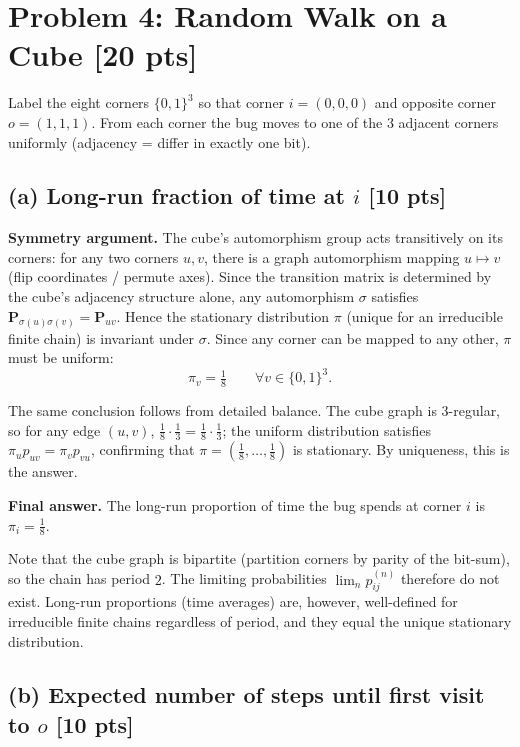 \documentclass[12pt]{article}
\newcommand{\mat}[1]{\bm{#1}}
\begin{document}
\section*{Problem 4: Random Walk on a Cube \hfill [20 pts]}

Label the eight corners $\{0,1\}^3$ so that corner $i=(0,0,0)$ and opposite corner $o=(1,1,1)$. From each corner the bug moves to one of the $3$ adjacent corners uniformly (adjacency = differ in exactly one bit).

\subsection*{(a) Long-run fraction of time at $i$ [10 pts]}

\textbf{Symmetry argument.} The cube's automorphism group acts transitively on its corners: for any two corners $u,v$, there is a graph automorphism mapping $u\mapsto v$ (flip coordinates / permute axes). Since the transition matrix is determined by the cube's adjacency structure alone, any automorphism $\sigma$ satisfies $\mat P_{\sigma(u)\sigma(v)}=\mat P_{uv}$. Hence the stationary distribution $\pi$ (unique for an irreducible finite chain) is invariant under $\sigma$. Since any corner can be mapped to any other, $\pi$ must be uniform:
\[
  \pi_v = \tfrac{1}{8}\qquad\forall v\in\{0,1\}^3.
\]

The same conclusion follows from detailed balance. The cube graph is $3$-regular, so for any edge $(u,v)$, $\tfrac{1}{8}\cdot\tfrac{1}{3}=\tfrac{1}{8}\cdot\tfrac{1}{3}$; the uniform distribution satisfies $\pi_u p_{uv}=\pi_v p_{vu}$, confirming that $\pi=(\tfrac18,\dots,\tfrac18)$ is stationary. By uniqueness, this is the answer.

\textbf{Final answer.} The long-run proportion of time the bug spends at corner $i$ is $\pi_i=\tfrac{1}{8}$.

Note that the cube graph is bipartite (partition corners by parity of the bit-sum), so the chain has period $2$. The limiting probabilities $\lim_n p_{ij}^{(n)}$ therefore do not exist. Long-run proportions (time averages) are, however, well-defined for irreducible finite chains regardless of period, and they equal the unique stationary distribution.

\subsection*{(b) Expected number of steps until first visit to $o$ [10 pts]}
\end{document}
